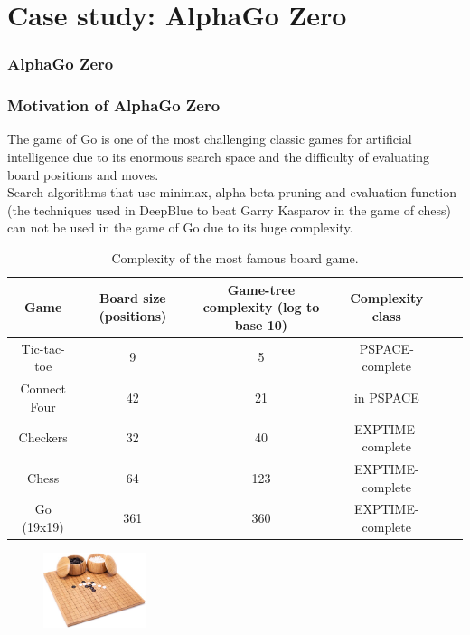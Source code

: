 \documentclass[10pt]{beamer}
\begin{document}

\section{Case study: AlphaGo Zero}

\begin{frame}
	\frametitle{AlphaGo Zero}
	
	\tableofcontents[ 
	currentsubsection, 
	hideothersubsections, 
	sectionstyle=show/shaded,
	]
	
\end{frame}


\begin{frame}
	\frametitle{Motivation of AlphaGo Zero}
	The game of Go is one of the most challenging classic games for artificial intelligence due to its enormous search space and the difficulty of evaluating board positions and moves.\\

	Search algorithms that use minimax, alpha-beta pruning and evaluation function (the techniques used in DeepBlue\cite{CAMPBELL200257} to beat Garry Kasparov in the game of chess) can not be used in the game of Go due to its huge complexity.

	\begin{table}

		\tiny
		\centering
		
		\begin{tabular}{|cccccc|}

		\hline
		Game  &
		Board size (positions)  &
		Game-tree complexity (log to base 10)  &
		Complexity class\\
		\hline
		\hline
		Tic-tac-toe	& 9  & 5 & PSPACE-complete\cite{Reisch1981HexIP} \\
		Connect Four & 42 & 21 & in PSPACE \cite{Allis1994SearchingFS} \\
		Checkers & 32  & 40   & EXPTIME-complete \cite{Robson1984NBN} \\
		Chess & 64 & 123  & EXPTIME-complete \cite{FRAENKEL1981199} \\
		Go (19x19) & 361 & 360 & EXPTIME-complete \cite{inproceedings} \\
		\hline
		\end{tabular}
		\caption{Complexity of the most famous board game.}
		\label{tab:game-complexity}
		
	\end{table}

	
	\begin{figure}[h]
		\centering
		\includegraphics[width=3cm]{go-board.jpg}
	\end{figure}


\end{frame}
\end{document}
